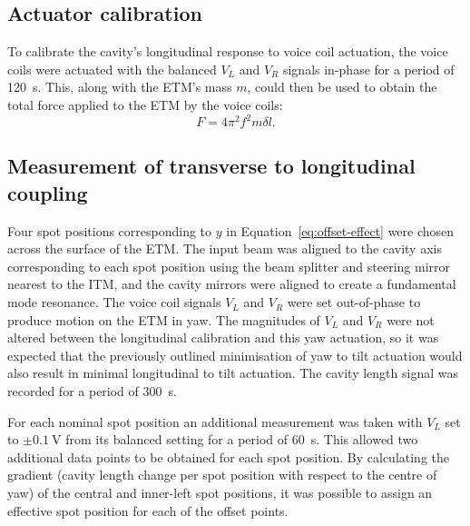 \subsection{Actuator calibration}

To calibrate the cavity's longitudinal response to voice coil actuation, the voice coils were actuated with the balanced $V_L$ and $V_R$ signals in-phase for a period of \SI{120}{\second}. This, along with the \gls{ETM}'s mass $m$, could then be used to obtain the total force applied to the \gls{ETM} by the voice coils:
\begin{equation}
  F = 4 \pi^2 f^2 m \delta l.
  \label{eq:force-calibration}
\end{equation}

\subsection{\label{sec:length-changes}Measurement of transverse to longitudinal coupling}


Four spot positions corresponding to $y$ in Equation~\ref{eq:offset-effect} were chosen across the surface of the \gls{ETM}. The input beam was aligned to the cavity axis corresponding to each spot position using the beam splitter and steering mirror nearest to the \gls{ITM}, and the cavity mirrors were aligned to create a fundamental mode resonance. The voice coil signals $V_L$ and $V_R$ were set out-of-phase to produce motion on the \gls{ETM} in yaw. The magnitudes of $V_L$ and $V_R$ were not altered between the longitudinal calibration and this yaw actuation, so it was expected that the previously outlined minimisation of yaw to tilt actuation would also result in minimal longitudinal to tilt actuation. The cavity length signal was recorded for a period of \SI{300}{\second}.

For each nominal spot position an additional measurement was taken with $V_L$ set to $\pm \SI{0.1}{\volt}$ from its balanced setting for a period of \SI{60}{\second}. This allowed two additional data points to be obtained for each spot position. By calculating the gradient (cavity length change per spot position with respect to the centre of yaw) of the central and inner-left spot positions, it was possible to assign an effective spot position for each of the offset points.

